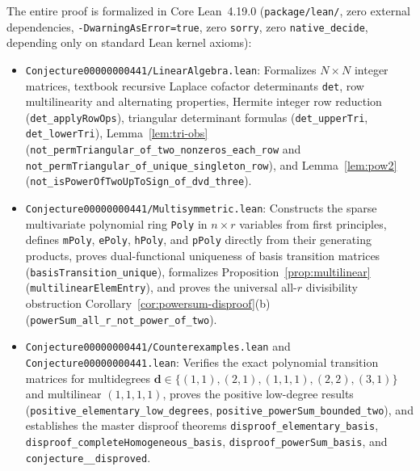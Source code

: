 \documentclass[11pt,a4paper]{article}
\theoremstyle{definition}
\theoremstyle{remark}
\newcommand{\vecd}{\mathbf{d}}
\begin{document}
The entire proof is formalized in Core Lean~4.19.0 (\texttt{package/lean/}, zero external dependencies, \texttt{-DwarningAsError=true}, zero \texttt{sorry}, zero \texttt{native\_decide}, depending only on standard Lean kernel axioms):
{\sloppy
\begin{itemize}
  \setlength{\itemsep}{3pt}
  \item \texttt{Conjecture00000000441/\allowbreak LinearAlgebra.lean}: Formalizes $N \times N$ integer matrices, textbook recursive Laplace cofactor determinants \texttt{det}, row multilinearity and alternating properties, Hermite integer row reduction (\texttt{det\_\allowbreak applyRowOps}), triangular determinant formulas (\texttt{det\_\allowbreak upperTri}, \texttt{det\_\allowbreak lowerTri}), Lemma~\ref{lem:tri-obs} (\texttt{not\_\allowbreak permTriangular\_\allowbreak of\_\allowbreak two\_\allowbreak nonzeros\_\allowbreak each\_\allowbreak row} and \texttt{not\_\allowbreak permTriangular\_\allowbreak of\_\allowbreak unique\_\allowbreak singleton\_\allowbreak row}), and Lemma~\ref{lem:pow2} (\texttt{not\_\allowbreak isPowerOfTwoUpToSign\_\allowbreak of\_\allowbreak dvd\_\allowbreak three}).
  \item \texttt{Conjecture00000000441/\allowbreak Multisymmetric.lean}: Constructs the sparse multivariate polynomial ring \texttt{Poly} in $n \times r$ variables from first principles, defines \texttt{mPoly}, \texttt{ePoly}, \texttt{hPoly}, and \texttt{pPoly} directly from their generating products, proves dual-functional uniqueness of basis transition matrices (\texttt{basisTransition\_\allowbreak unique}), formalizes Proposition~\ref{prop:multilinear} (\texttt{multilinearElemEntry}), and proves the universal all-$r$ divisibility obstruction Corollary~\ref{cor:powersum-disproof}(b) (\texttt{powerSum\_\allowbreak all\_\allowbreak r\_\allowbreak not\_\allowbreak power\_\allowbreak of\_\allowbreak two}).
  \item \texttt{Conjecture00000000441/\allowbreak Counterexamples.lean} and \texttt{Conjecture00000000441.lean}: Verifies the exact polynomial transition matrices for multidegrees $\vecd \in \{(1,1), (2,1), (1,1,1), (2,2), (3,1)\}$ and multilinear $(1,1,1,1)$, proves the positive low-degree results (\texttt{positive\_\allowbreak elementary\_\allowbreak low\_\allowbreak degrees}, \texttt{positive\_\allowbreak powerSum\_\allowbreak bounded\_\allowbreak two}), and establishes the master disproof theorems \texttt{disproof\_\allowbreak elementary\_\allowbreak basis}, \texttt{disproof\_\allowbreak completeHomogeneous\_\allowbreak basis}, \texttt{disproof\_\allowbreak powerSum\_\allowbreak basis}, and \texttt{conjecture\_\_\allowbreak disproved}.
\end{itemize}
}
\end{document}
